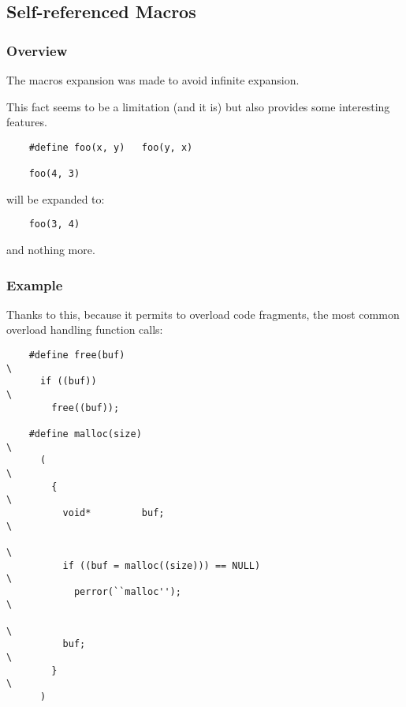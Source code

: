 %
%

\subsection{Self-referenced Macros}


\begin{frame}[containsverbatim]
  \frametitle{Overview}

  The macros expansion was made to avoid infinite expansion.

  \nl

  This fact seems to be a limitation (and it is) but also provides
  some interesting features.

  \begin{verbatim}
    #define foo(x, y)   foo(y, x)

    foo(4, 3)
  \end{verbatim}

  will be expanded to:

  \begin{verbatim}
    foo(3, 4)
  \end{verbatim}

  and nothing more.
\end{frame}


\begin{frame}[containsverbatim]
  \frametitle{Example}

  Thanks to this, because it permits to overload code fragments, the most
  common overload handling function calls:

  \begin{verbatim}
    #define free(buf)                                                   \
      if ((buf))                                                        \
        free((buf));

    #define malloc(size)                                                \
      (                                                                 \
        {                                                               \
          void*         buf;                                            \
                                                                        \
          if ((buf = malloc((size))) == NULL)                           \
            perror(``malloc'');                                         \
                                                                        \
          buf;                                                          \
        }                                                               \
      )
  \end{verbatim}
\end{frame}

